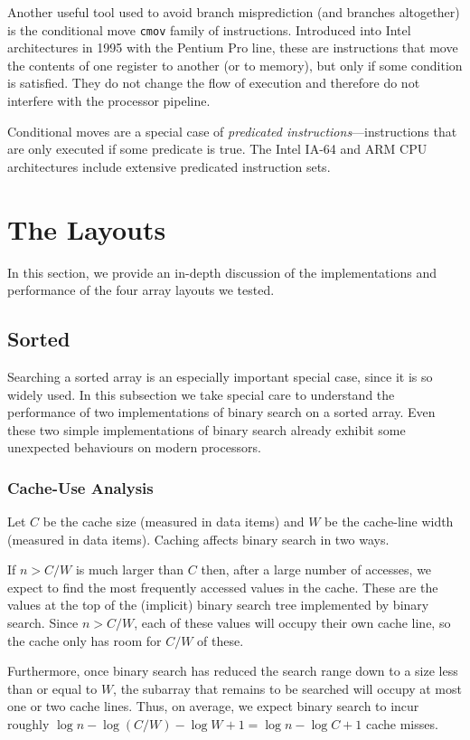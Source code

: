 \documentclass{patmorin}
\begin{document}
Another useful tool used to avoid branch misprediction (and branches
altogether) is the conditional move \texttt{cmov} family
of instructions.  Introduced into Intel architectures in 1995 with
the Pentium Pro line, these are instructions that move the contents of
one register to another (or to memory), but only if some condition is
satisfied. They do not change the flow of execution and therefore do
not interfere with the processor pipeline.

Conditional moves are a special case of \emph{predicated
instructions}---instructions that are only executed if some predicate
is true.  The Intel IA-64 and ARM CPU architectures include extensive
predicated instruction sets.

\section{The Layouts}

In this section, we provide an in-depth discussion of the implementations
and performance of the four array layouts we tested.

\subsection{Sorted}

Searching a sorted array is an especially important special case, since it
is so widely used.  In this subsection we take special care to understand
the performance of two implementations of binary search on a sorted array.
Even these two simple implementations of binary search already exhibit some
unexpected behaviours on modern processors.

\subsubsection{Cache-Use Analysis}

Let $C$ be the cache size (measured in data items) and $W$ be the
cache-line width (measured in data items).  Caching affects binary search
in two ways.

If $n> C/W$ is much larger than $C$ then, after a large number of
accesses, we expect to find the most frequently accessed values in the
cache.  These are the values at the top of the (implicit) binary search
tree implemented by binary search.  Since $n>C/W$, each of these values
will occupy their own cache line, so the cache only has room for $C/W$
of these.

Furthermore, once binary search has reduced the search range down to a
size less than or equal to $W$, the subarray that remains to be searched
will occupy at most one or two cache lines. Thus, on average, we expect
binary search to incur roughly $\log n -\log(C/W) - \log W + 1 = \log n -
\log C + 1$ cache misses.
\end{document}
